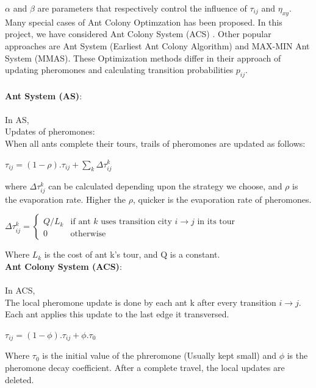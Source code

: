 \documentclass[11pt, english]{article}
\begin{document}
\tab $\alpha$ and $\beta$ are parameters that respectively control the influence of $\tau_{ij}$ and $\eta _{xy}$.\\

\noindent
Many special cases of Ant Colony Optimzation has been proposed. In this project, we have considered Ant Colony System (ACS) \cite{Dorigo1997}. Other popular approaches are Ant System (Earliest Ant Colony Algorithm)\cite{Dorigo06antcolony} and MAX-MIN Ant System (MMAS)\cite{Sttzle1998}. These Optimization methods differ in their approach of updating pheromones and calculating transition probabilities $p_{ij}$. \\
\\
\noindent
{\bf Ant System (AS)}:\\
\\
In AS,\\
\noindent
Updates of pheromones:\\ 
When all ants complete their tours, trails of pheromones are updated as follows:

\begin{center}
$\tau_{ij} = (1-\rho).\tau_{ij} + \sum_{k}\Delta \tau_{ij}^k$
\end{center}
where $\Delta \tau_{ij}^k$ can be calculated depending upon the strategy we choose, and $\rho$ is the evaporation rate. Higher the $\rho$, quicker is the evaporation rate of pheromones.\\
\begin{center}
$\Delta \tau _{ij}^{k}={\begin{cases}Q/L_{k}&{\mbox{if ant }}k{\mbox{ uses transition city }}i \rightarrow j{\mbox{ in its tour}}\\0&{\mbox{otherwise}}\end{cases}}$\\
\end{center}
\noindent
Where $L_{k}$ is the cost of ant k's tour, and Q is a constant.\\

\noindent
{\bf Ant Colony System (ACS)}: \\
\\
In ACS,\\
The local pheromone update is done by each ant k after every transition $i \rightarrow j$. Each ant applies this update to the last edge it transversed.
\begin{center} {$\tau_{ij} = (1-\phi).\tau_{ij} + \phi.\tau_{0}$} \end{center}
Where $\tau_{0}$ is the initial value of the phreromone (Usually kept small) and $\phi$ is the pheromone decay coefficient. After a complete travel, the local updates are deleted.\cite{Dorigo1997}\\
\end{document}
